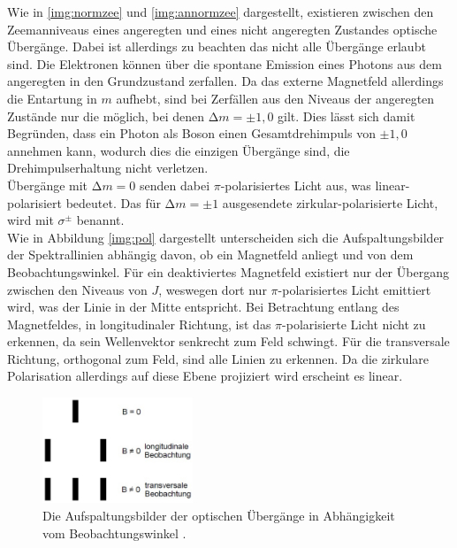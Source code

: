 \noindent 
Wie in \autoref{img:normzee} und \autoref{img:annormzee} dargestellt, existieren zwischen den Zeemanniveaus eines angeregten und eines nicht angeregten Zustandes optische Übergänge.
Dabei ist allerdings zu beachten das nicht alle Übergänge erlaubt sind. 
Die Elektronen können über die spontane Emission eines Photons aus dem angeregten in den Grundzustand zerfallen.
Da das externe Magnetfeld allerdings die Entartung in $m$ aufhebt, sind bei Zerfällen aus den Niveaus der angeregten Zustände nur die möglich, bei denen $\increment m = \pm 1, 0$ gilt.
Dies lässt sich damit Begründen, dass ein Photon als Boson einen Gesamtdrehimpuls von $\pm 1, 0 $ annehmen kann, wodurch dies die einzigen Übergänge sind, die Drehimpulserhaltung nicht verletzen.\\
Übergänge mit $\increment m = 0$ senden dabei $\pi$-polarisiertes Licht aus, was linear-polarisiert bedeutet. 
Das für $\increment m = \pm 1$ ausgesendete zirkular-polarisierte Licht, wird mit $\sigma^{\pm}$ benannt.\\
Wie in Abbildung \autoref{img:pol} dargestellt unterscheiden sich die Aufspaltungsbilder der Spektrallinien abhängig davon, ob ein Magnetfeld anliegt und von dem Beobachtungswinkel.
Für ein deaktiviertes Magnetfeld existiert nur der Übergang zwischen den Niveaus von $J$, weswegen dort nur $\pi$-polarisiertes Licht emittiert wird, was der Linie in der Mitte entspricht.
Bei Betrachtung entlang des Magnetfeldes, in longitudinaler Richtung, ist das $\pi$-polarisierte Licht nicht zu erkennen, da sein Wellenvektor senkrecht zum Feld schwingt.
Für die transversale Richtung, orthogonal zum Feld, sind alle Linien zu erkennen. Da die zirkulare Polarisation allerdings auf diese Ebene projiziert wird erscheint es linear.


\begin{figure}[H]
    \centering
    \includegraphics[width=0.4\textwidth]{latex/images/polarisation.PNG}
    \caption{Die Aufspaltungsbilder der optischen Übergänge in Abhängigkeit vom Beobachtungswinkel \protect \cite{alt}.}
    \label{img:pol}
\end{figure}


